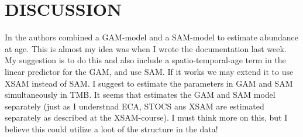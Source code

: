 \documentclass[a4paper 12pt]{article}
\numberwithin{equation}{section}
\begin{document}
\clearpage

\section{DISCUSSION}

In \citet{berg2014evaluation} the authors combined a GAM-model and a SAM-model to estimate abundance at age. This is almost my idea was when I wrote the documentation last week. My suggestion is to do this and also include a spatio-temporal-age term in the linear predictor for the GAM, and use SAM. If it works we may extend it to use XSAM instead of SAM. I suggest to estimate the parameters in GAM and SAM simultaneously in TMB. It seems that \citet{berg2014evaluation} estimates the GAM and SAM model separately (just as I understnad ECA, STOCS ans XSAM are estimated separately as described at the XSAM-course). I must think more on this, but I believe this could utilize a loot of the structure in the data!





\clearpage
\end{document}
